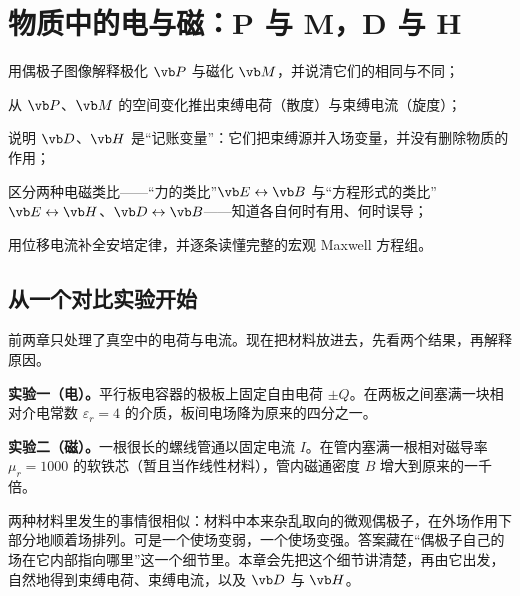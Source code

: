 \chapter{物质中的电与磁：P 与 M，D 与 H}\label{ch:matter}

\begin{chapterguide}
\begin{guidegoals}
\item 用偶极子图像解释极化 $\vb P$ 与磁化 $\vb M$，并说清它们的相同与不同；
\item 从 $\vb P$、$\vb M$ 的空间变化推出束缚电荷（散度）与束缚电流（旋度）；
\item 说明 $\vb D$、$\vb H$ 是“记账变量”：它们把束缚源并入场变量，并没有删除物质的作用；
\item 区分两种电磁类比——“力的类比”$\vb E\leftrightarrow\vb B$ 与“方程形式的类比”$\vb E\leftrightarrow\vb H$、$\vb D\leftrightarrow\vb B$——知道各自何时有用、何时误导；
\item 用位移电流补全安培定律，并逐条读懂完整的宏观 Maxwell 方程组。
\end{guidegoals}
\end{chapterguide}

\section{从一个对比实验开始}\label{sec:matter-puzzle}

前两章只处理了真空中的电荷与电流。现在把材料放进去，先看两个结果，再解释原因。

\textbf{实验一（电）。}平行板电容器的极板上固定自由电荷 $\pm Q$。在两板之间塞满一块相对介电常数 $\varepsilon_r=4$ 的介质，板间电场降为原来的四分之一。

\textbf{实验二（磁）。}一根很长的螺线管通以固定电流 $I$。在管内塞满一根相对磁导率 $\mu_r=1000$ 的软铁芯（暂且当作线性材料），管内磁通密度 $B$ 增大到原来的一千倍。

两种材料里发生的事情很相似：材料中本来杂乱取向的微观偶极子，在外场作用下部分地顺着场排列。可是一个使场变弱，一个使场变强。答案藏在“偶极子自己的场在它内部指向哪里”这一个细节里。本章会先把这个细节讲清楚，再由它出发，自然地得到束缚电荷、束缚电流，以及 $\vb D$ 与 $\vb H$。

